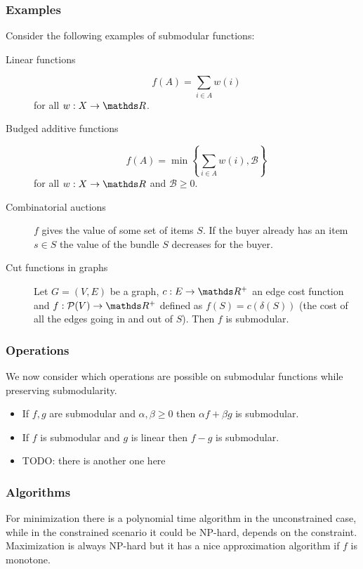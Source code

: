 \documentclass[12pt]{extarticle}
\begin{document}
\subsubsection{Examples}
Consider the following examples of submodular functions:
\begin{description}
	\item[Linear functions]
	      \begin{equation}
		      f(A) = \sum_{i \in A} w(i)
	      \end{equation}
	      for all $w: X \to \R$.
	\item[Budged additive functions]
	      \begin{equation}
		      f(A) = \min \left\{\sum_{i \in A} w(i), \mathcal B \right\}
	      \end{equation}
	      for all $w: X \to \R$ and $\mathcal B \geq 0$.
	\item[Combinatorial auctions] $f$ gives the value of some set of items $S$. If the buyer already
	      has an item $s \in S$ the value of the bundle $S$ decreases for the buyer.

	\item[Cut functions in graphs] Let $G = (V, E)$ be a graph, $c: E \to \R^+$ an edge cost function
	      and $f: \mathcal P(V) \to \R^+$ defined as $f(S) = c(\delta(S))$ (the cost of all the edges
	      going in and out of $S$). Then $f$ is submodular.
\end{description}

\subsubsection{Operations}

We now consider which operations are possible on submodular functions while preserving
submodularity.
\begin{itemize}
	\item If $f, g$ are submodular and $\alpha, \beta \geq 0$ then $\alpha f + \beta g$ is submodular.
	\item If $f$ is submodular and $g$ is linear then $f - g$ is submodular.
	\item TODO: there is another one here
\end{itemize}

\subsubsection{Algorithms}

For minimization there is a polynomial time algorithm in the unconstrained case, while in the
constrained scenario it could be NP-hard, depends on the constraint.
Maximization is always NP-hard but it has a nice approximation algorithm if $f$ is monotone.
\end{document}
